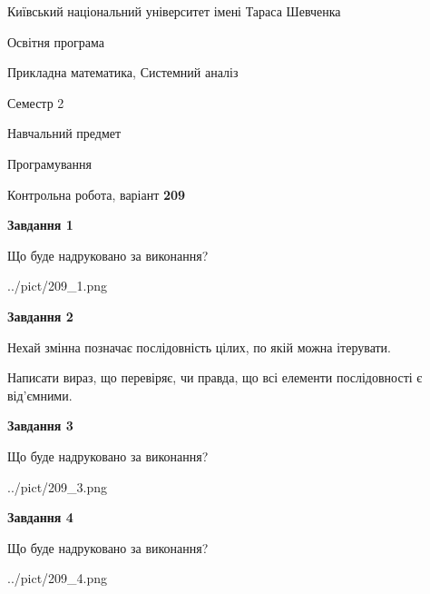 \documentclass[12pt, ukrainian]{article}
\begin{document}
{{\begin {small}\par
{ \center  Київський національний університет імені Тараса Шевченка \par}
{\parbox {5 cm}{Освітня програма \hfill}{\parbox {8 cm}{Прикладна математика, Системний аналіз \hfill}}\parbox {5 cm}{\hfill Семестр 2}}\par
{\parbox {5 cm} {Навчальний предмет \hfill}\parbox {7 cm}{Програмування \hfill}\parbox {6cm}{\hfill}\par}\vspace{-7pt} \end{small}}{\center Контрольна робота, варіант  \No \textbf
{ 209 }\par}}
{
\begin {large}
{\begin {center}\textbf{Завдання 1}\end {center}}\par
Що буде надруковано за виконання?\par\par
\begin{center}
	{../pict/209_1.png}
\end{center}
\newpage

{\begin {center}\textbf{Завдання 2}\end {center}}\par
Нехай змінна  позначає послідовність цілих, по якій можна ітерувати.

Написати вираз, що перевіряє, чи правда, що всі елементи послідовності є від’ємни\-ми.\par
\newpage

{\begin {center}\textbf{Завдання 3}\end {center}}\par
Що буде надруковано за виконання?
\begin{center}
	{../pict/209_3.png}
\end{center}
\newpage

{\begin {center}\textbf{Завдання 4}\end {center}}\par
Що буде надруковано за виконання?\par
\begin{center}
	{../pict/209_4.png}
\end{center}
\newpage


\end{large}}
\end{document}

